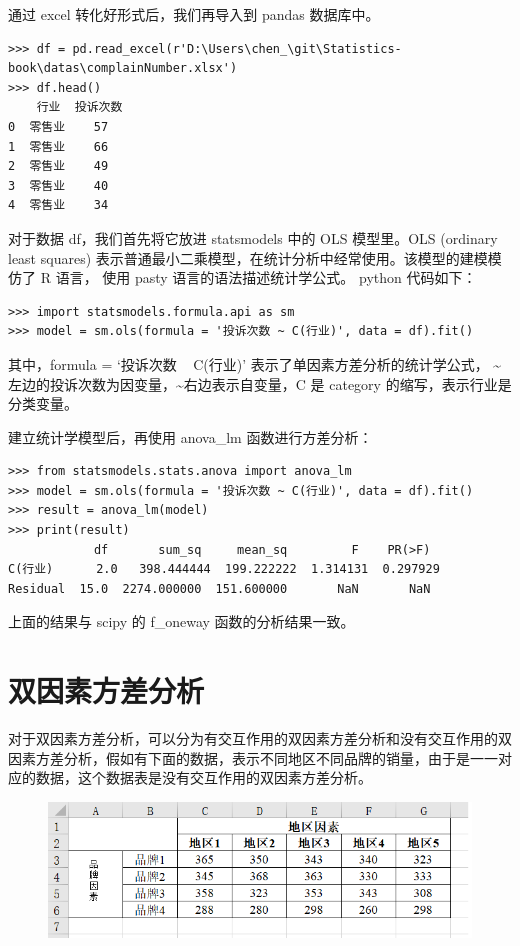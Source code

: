 通过 excel 转化好形式后，我们再导入到 pandas 数据库中。

\begin{lstlisting}[Language=Python]
>>> df = pd.read_excel(r'D:\Users\chen_\git\Statistics-book\datas\complainNumber.xlsx')
>>> df.head()
    行业  投诉次数
0  零售业    57
1  零售业    66
2  零售业    49
3  零售业    40
4  零售业    34
\end{lstlisting}

对于数据 df，我们首先将它放进 statsmodels 中的 OLS 模型里。OLS (ordinary least squares) 表示普通最小二乘模型，在统计分析中经常使用。该模型的建模模仿了 R 语言， 使用 pasty 语言的语法描述统计学公式。 python 代码如下：

\begin{lstlisting}[Language=Python]
>>> import statsmodels.formula.api as sm
>>> model = sm.ols(formula = '投诉次数 ~ C(行业)', data = df).fit()
\end{lstlisting}

其中，formula = `投诉次数 ~ C(行业)' 表示了单因素方差分析的统计学公式， \textasciitilde 左边的投诉次数为因变量，\textasciitilde 右边表示自变量，C 是 category 的缩写，表示行业是分类变量。

建立统计学模型后，再使用 anova\_lm 函数进行方差分析：

\begin{lstlisting}[Language=Python]
>>> from statsmodels.stats.anova import anova_lm
>>> model = sm.ols(formula = '投诉次数 ~ C(行业)', data = df).fit()
>>> result = anova_lm(model)
>>> print(result)
            df       sum_sq     mean_sq         F    PR(>F)
C(行业)      2.0   398.444444  199.222222  1.314131  0.297929
Residual  15.0  2274.000000  151.600000       NaN       NaN

\end{lstlisting}

上面的结果与 scipy 的 f\_oneway 函数的分析结果一致。

\section{双因素方差分析}

对于双因素方差分析，可以分为有交互作用的双因素方差分析和没有交互作用的双因素方差分析，假如有下面的数据，表示不同地区不同品牌的销量，由于是一一对应的数据，这个数据表是没有交互作用的双因素方差分析。


\begin{figure}[ht]
  \centering
  \includegraphics[scale=0.8]{figure/chapter3/twoFactor.png}
\end{figure}

